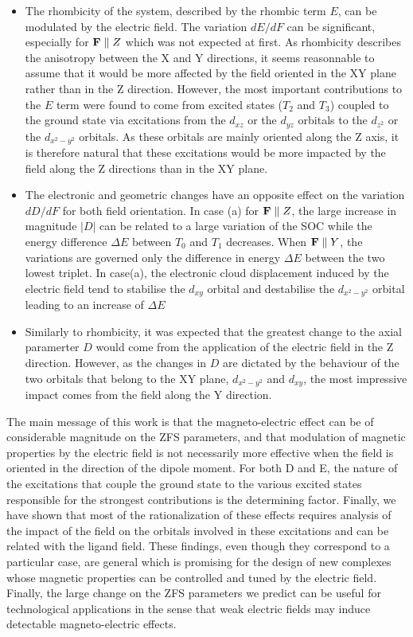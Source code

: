 \documentclass[12pt,a4paper]{report}
\numberwithin{equation}{section}
\begin{document}
\begin{itemize}
    \item[(i)] The rhombicity of the system, described by the rhombic term $E$, can be modulated by the electric field. 
    The variation $dE/dF$ can be significant, especially for $\vb{F}\parallel Z$ which was not expected at first.
    As rhombicity describes the anisotropy between the X and Y directions, it seems reasonnable to assume that it would be more affected by the field oriented in the XY plane rather than in the Z direction.
    However, the most important contributions to the $E$ term were found to come from excited states ($T_2$ and $T_3$) coupled to the ground state via excitations from the $d_{xz}$ or the $d_{yz}$ orbitals to the $d_{z^2}$ or the $d_{x^2-y^2}$ orbitals.
    As these orbitals are mainly oriented along the Z axis, it is therefore natural that these excitations would be more impacted by the field along the Z directions than in the XY plane.
    \item[(ii)] The electronic and geometric changes have an opposite effect on the variation $dD/dF$ for both field orientation. 
    In case (a) for $\vb{F}\parallel Z$, the large increase in magnitude $|D|$ can be related to a large variation of the SOC while the energy difference $\Delta E$ between $T_0$ and $T_1$ decreases.
    When $\vb{F}\parallel Y$, the variations are governed only the difference in energy $\Delta E$ between the two lowest triplet. 
    In case(a), the electronic cloud displacement induced by the electric field tend to stabilise the $d_{xy}$ orbital and destabilise the $d_{x^2-y^2}$ orbital leading to an increase of $\Delta E$
    \item[(iii)] Similarly to rhombicity, it was expected that the greatest change to the axial paramerter $D$ would come from the application of the electric field in the Z direction.
    However, as the changes in $D$ are dictated by the behaviour of the two orbitals that belong to the XY plane, $d_{x^2-y^2}$ and $d_{xy}$, the most impressive impact comes from the field along the Y direction.
\end{itemize}
The main message of this work is that the magneto-electric effect can be of considerable magnitude
on the ZFS parameters, and that modulation of magnetic properties by the electric field is not
necessarily more effective when the field is oriented in the direction of the dipole moment. For both
D and E, the nature of the excitations that couple the ground state to the various excited states
responsible for the strongest contributions is the determining factor. Finally, we have shown that most
of the rationalization of these effects requires analysis of the impact of the field on the orbitals
involved in these excitations and can be related with the ligand field. These findings, even though
they correspond to a particular case, are general which is promising for the design of new complexes
whose magnetic properties can be controlled and tuned by the electric field. Finally, the large change
on the ZFS parameters we predict can be useful for technological applications in the sense that weak
electric fields may induce detectable magneto-electric effects.
\end{document}

